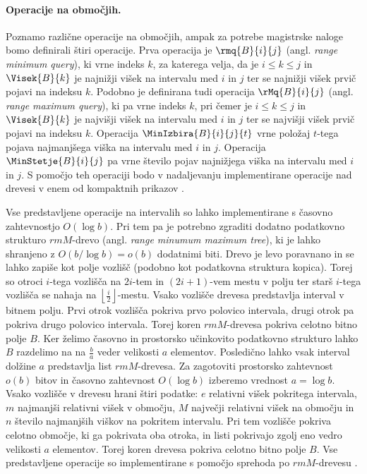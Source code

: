 \paragraph{Operacije na območjih.}
Poznamo različne operacije na območjih, ampak za potrebe magistrske naloge bomo definirali štiri operacije.
Prva operacija je $\rmq{B}{i}{j}$ (angl. \textit{range minimum query}), ki vrne indeks $k$, za katerega velja, da je $i\le k\le j$ in $\Visek{B}{k}$ je najnižji višek na intervalu med $i$ in $j$ ter se najnižji višek prvič pojavi na indeksu $k$. Podobno je definirana tudi operacija $\rMq{B}{i}{j}$ (angl. \textit{range maximum query}), ki pa vrne indeks $k$, pri čemer je $i\le k\le j$ in $\Visek{B}{k}$ je najvišji višek na intervalu med $i$ in $j$ ter se najvišji višek prvič pojavi na indeksu $k$. Operacija $\MinIzbira{B}{i}{j}{t}$ vrne položaj $t$-tega pojava najmanjšega viška na intervalu med $i$ in $j$. Operacija $\MinStetje{B}{i}{j}$ pa vrne število pojav najnižjega viška na intervalu med $i$ in $j$. S pomočjo teh operaciji bodo v nadaljevanju implementirane operacije nad drevesi v enem od kompaktnih prikazov \cite{Navarro2016}.

Vse predstavljene operacije na intervalih so lahko implementirane s časovno zahtevnostjo $O(\log{b})$. Pri tem pa je potrebno zgraditi dodatno podatkovno strukturo $rmM$-drevo (angl. \textit{range minumum maximum tree}), ki je lahko shranjeno z $O(b/\log{b})=o(b)$ dodatnimi biti. Drevo je levo poravnano in se lahko zapiše kot polje vozlišč (podobno kot podatkovna struktura kopica). Torej so otroci $i$-tega vozlišča na $2i$-tem in $(2i+1)$-vem mestu v polju ter starš $i$-tega vozlišča se nahaja na $\left\lfloor\frac{i}{2}\right\rfloor$-mestu. Vsako vozlišče drevesa predstavlja interval v bitnem polju. Prvi otrok vozlišča pokriva prvo polovico intervala, drugi otrok pa pokriva drugo polovico intervala. Torej koren $rmM$-drevesa pokriva celotno bitno polje $B$. Ker želimo časovno in prostorsko učinkovito podatkovno strukturo lahko $B$ razdelimo na na $\frac{b}{a}$ veder velikosti $a$ elementov. Posledično lahko vsak interval dolžine $a$ predstavlja list $rmM$-drevesa. Za zagotoviti prostorsko zahtevnost $o(b)$ bitov in časovno zahtevnost $O(\log{b})$ izberemo vrednost $a = \log{b}$. Vsako vozlišče v drevesu hrani štiri podatke: $e$ relativni višek pokritega intervala, $m$ najmanjši relativni višek v območju, $M$ največji relativni višek na območju in $n$ število najmanjših viškov na pokritem intervalu. Pri tem vozlišče pokriva celotno območje, ki ga pokrivata oba otroka, in listi pokrivajo zgolj eno vedro velikosti $a$ elementov. Torej koren drevesa pokriva celotno bitno polje $B$. Vse predstavljene operacije so implementirane s pomočjo sprehoda po $rmM$-drevesu \cite{Navarro2016}.

